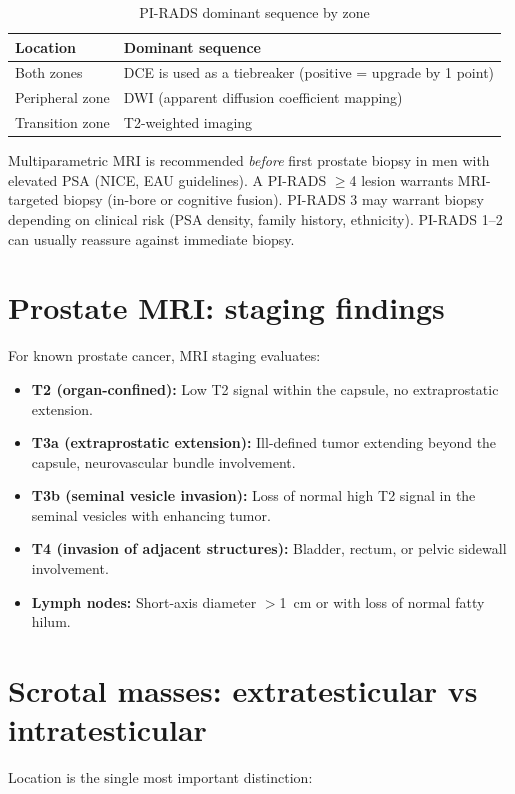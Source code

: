 \begin{table}[h]
\centering
\caption{PI-RADS dominant sequence by zone}
\label{tab:pirads_zone}
\begin{tabular}{@{}p{}p{}@{}}
\hline
\textbf{Location} & \textbf{Dominant sequence} \\
\hline
Both zones & DCE is used as a tiebreaker (positive = upgrade by 1 point) \\
Peripheral zone & DWI (apparent diffusion coefficient mapping) \\
Transition zone & T2-weighted imaging \\
\hline
\end{tabular}
\end{table}

\begin{pearlbox}
Multiparametric MRI is recommended \emph{before} first prostate biopsy in men with elevated PSA (NICE, EAU guidelines). A PI-RADS $\geq$4 lesion warrants MRI-targeted biopsy (in-bore or cognitive fusion). PI-RADS 3 may warrant biopsy depending on clinical risk (PSA density, family history, ethnicity). PI-RADS 1--2 can usually reassure against immediate biopsy.
\end{pearlbox}

\section{Prostate MRI: staging findings}
For known prostate cancer, MRI staging evaluates:
\begin{itemize}
    \item \textbf{T2 (organ-confined):} Low T2 signal within the capsule, no extraprostatic extension.
    \item \textbf{T3a (extraprostatic extension):} Ill-defined tumor extending beyond the capsule, neurovascular bundle involvement.
    \item \textbf{T3b (seminal vesicle invasion):} Loss of normal high T2 signal in the seminal vesicles with enhancing tumor.
    \item \textbf{T4 (invasion of adjacent structures):} Bladder, rectum, or pelvic sidewall involvement.
    \item \textbf{Lymph nodes:} Short-axis diameter $>$1~cm or with loss of normal fatty hilum.
\end{itemize}

\section{Scrotal masses: extratesticular vs intratesticular}
Location is the single most important distinction:

